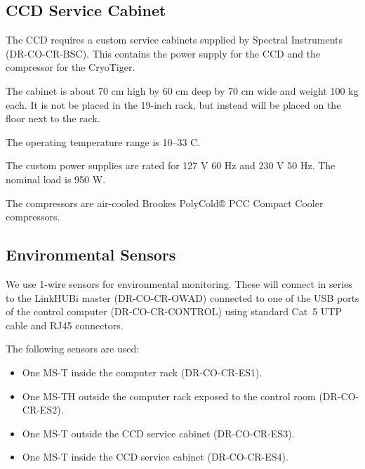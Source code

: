 \documentclass{article}
\begin{document}

\subsection{CCD Service Cabinet}

The CCD requires a custom service cabinets supplied by Spectral Instruments (DR-CO-CR-BSC). This contains the power supply for the CCD and the compressor for the CryoTiger. 

The cabinet is about 70 cm high by 60 cm deep by 70 cm wide and weight 100 kg each. It is not be placed in the 19-inch rack, but instead will be placed on the floor next to the rack.

The operating temperature range is 10--33 C.

The custom power supplies are rated for 127 V 60 Hz and 230 V 50 Hz. The nominal load is 950 W.

The compressors are air-cooled Brookes PolyCold® PCC Compact Cooler compressors.

\subsection{Environmental Sensors}

We use 1-wire sensors for environmental monitoring. These will connect in series to the LinkHUBi master (DR-CO-CR-OWAD) connected to one of the USB ports of the control computer (DR-CO-CR-CONTROL) using standard Cat~5 UTP cable and RJ45 connectors.

The following sensors are used:
\begin{itemize}
\item One MS-T inside the computer rack (DR-CO-CR-ES1).
\item One MS-TH outside the computer rack exposed to the control room (DR-CO-CR-ES2).
\item One MS-T outside the CCD service cabinet (DR-CO-CR-ES3).
\item One MS-T inside the CCD service cabinet (DR-CO-CR-ES4).
\end{itemize}
\end{document}
